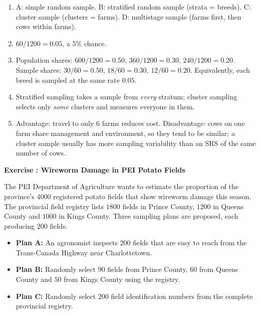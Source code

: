 \documentclass[11pt]{article}
\newcounter{exercise}
\newcommand{\exercise}[1]{%
  \par\medskip
  \refstepcounter{exercise}%
  {\large\bfseries\color{CourseBlue} Exercise \theexercise: #1}\par\smallskip}
\begin{document}
\begin{solution}
\begin{enumerate}
  \item A: simple random sample. B: stratified random sample (strata = breeds). C: cluster sample (clusters = farms). D: multistage sample (farms first, then cows within farms).
  \item $60/1200=0.05$, a $5\%$ chance.
  \item Population shares: $600/1200=0.50$, $360/1200=0.30$, $240/1200=0.20$. Sample shares: $30/60=0.50$, $18/60=0.30$, $12/60=0.20$. Equivalently, each breed is sampled at the same rate $0.05$.
  \item Stratified sampling takes a sample from \emph{every} stratum; cluster sampling selects only \emph{some} clusters and measures everyone in them.
  \item Advantage: travel to only $6$ farms reduces cost. Disadvantage: cows on one farm share management and environment, so they tend to be similar; a cluster sample usually has more sampling variability than an SRS of the same number of cows.
\end{enumerate}
\end{solution}

\exercise{Wireworm Damage in PEI Potato Fields}

The PEI Department of Agriculture wants to estimate the proportion of the province's $4000$ registered potato fields that show wireworm damage this season. The provincial field registry lists $1800$ fields in Prince County, $1200$ in Queens County and $1000$ in Kings County. Three sampling plans are proposed, each producing $200$ fields.

\begin{itemize}[itemsep=0.1em]
  \item \textbf{Plan A:} An agronomist inspects $200$ fields that are easy to reach from the Trans-Canada Highway near Charlottetown.
  \item \textbf{Plan B:} Randomly select $90$ fields from Prince County, $60$ from Queens County and $50$ from Kings County using the registry.
  \item \textbf{Plan C:} Randomly select $200$ field identification numbers from the complete provincial registry.
\end{itemize}
\end{document}
